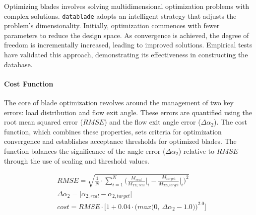 \documentclass[11pt,a4paper,twocolumn]{article}
\begin{document}
Optimizing blades involves solving multidimensional optimization problems with complex solutions. \texttt{datablade} adopts an intelligent strategy that adjusts the problem's dimensionality. Initially, optimization commences with fewer parameters to reduce the design space. As convergence is achieved, the degree of freedom is incrementally increased, leading to improved solutions. Empirical tests have validated this approach, demonstrating its effectiveness in constructing the database.

\paragraph{Cost Function}

The core of blade optimization revolves around the management of two key errors: load distribution and flow exit angle. These errors are quantified using the root mean squared error ($RMSE$) and the flow exit angle error ($\Delta \alpha_2$). The cost function, which combines these properties, sets criteria for optimization convergence and establishes acceptance thresholds for optimized blades. The function balances the significance of the angle error ($\Delta \alpha_2$) relative to $RMSE$ through the use of scaling and threshold values.

{\scriptsize
\begin{align}
    & RMSE             = \sqrt{\frac{1}{N} \cdot \sum_{i = 1}^{N} \Bigg( \frac{M_{real}}{M_{TE, real}} \Bigg|_{i} - \frac{M_{target}}{M_{TE, target}} \Bigg|_{i} \Bigg)^2} 
    \label{eqn:RMSE}
    \\ 
    & \Delta \alpha_2  = \Big| \alpha_{2, real} - \alpha_{2, target} \Big| 
    \label{eqn:angleError}
    \\
    & cost             = RMSE \cdot \Big[ 1 + 0.04 \cdot \Big( max \Big( 0, \ \Delta \alpha_2 - 1.0 \Big) \Big)^{2.0} \Big]
    \label{eqn:costFunction}
\end{align}
}
\end{document}
